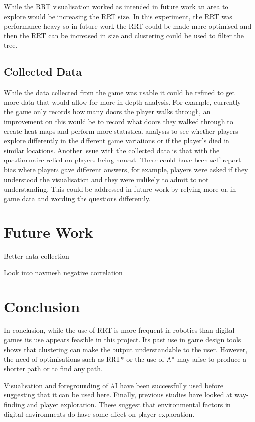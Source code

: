 \documentclass[journal]{IEEEtran}
\begin{document}
	While the RRT visualisation worked as intended in future work an area to explore would be increasing the RRT size.  In this experiment, the RRT was performance heavy so in future work the RRT could be made more optimised and then the RRT can be increased in size and clustering could be used to filter the tree.
	
	\subsection{Collected Data}    
	While the data collected from the game was usable it could be refined to get more data that would allow for more in-depth analysis. For example, currently the game only records how many doors the player walks through, an improvement on this would be to record what doors they walked through to create heat maps and perform more statistical analysis to see whether players explore differently in the different game variations or if the player's died in similar locations.
	Another issue with the collected data is that with the questionnaire relied on players being honest. There could have been self-report bias where players gave different answers, for example, players were asked if they understood the visualisation and they were unlikely to admit to not understanding. This could be addressed in future work by relying more on in-game data and wording the questions differently.
     
    \section{Future Work} 
	Better data collection 
	
	Look into navmesh negative correlation 
	
	\section{Conclusion} 
	In conclusion, while the use of RRT is more frequent in robotics than digital games its use appears feasible in this project. Its past use in game design tools shows that clustering can make the output understandable to the user. However, the need of optimisations such as RRT* or the use of A* may arise to produce a shorter path or to find any path. 
	
	Visualisation and foregrounding of AI have been successfully used before suggesting that it can be used here. Finally, previous studies have looked at way-finding and player exploration. These suggest that environmental factors in digital environments do have some effect on player exploration.
	
\end{document}
